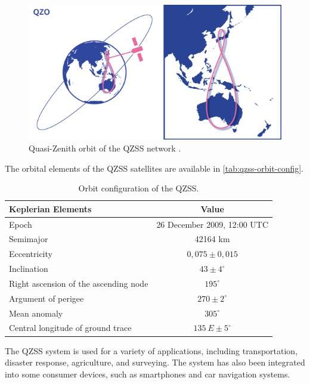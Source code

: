 \begin{figure}[!ht]
    \begin{center}
        \includegraphics[width=0.8\columnwidth]{figures/qzss-orbit}
        \caption{Quasi-Zenith orbit of the QZSS network \cite{qzss}.}
        \label{fig:qzss-orbit}
    \end{center}
\end{figure}

The orbital elements of the QZSS satellites are available in \autoref{tab:qzss-orbit-config}.

\begin{table}[!ht]
    \centering
    \begin{tabular}{lc}
        \toprule[1.5pt]
        \textbf{Keplerian Elements} & \textbf{Value} \\
        \midrule
        Epoch                                   & 26 December 2009, 12:00 UTC \\
        Semimajor                               & 42164 km \\
        Eccentricity                            & $0,075 \pm 0,015$ \\
        Inclination                             & $43 \pm 4^{\circ}$ \\
        Right ascension of the ascending node   & $195^{\circ}$ \\
        Argument of perigee                     & $270 \pm 2^{\circ}$ \\
        Mean anomaly                            & $305^{\circ}$ \\
        Central longitude of ground trace       & $135\ E \pm 5^{\circ}$ \\
        \bottomrule[1.5pt]
    \end{tabular}
    \caption{Orbit configuration of the QZSS.}
    \label{tab:qzss-orbit-config}
\end{table}

The QZSS system is used for a variety of applications, including transportation, disaster response, agriculture, and surveying. The system has also been integrated into some consumer devices, such as smartphones and car navigation systems.

